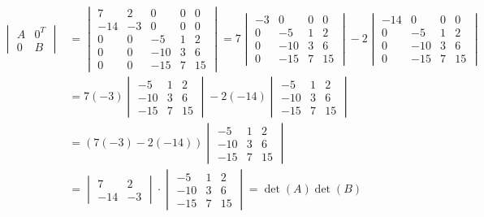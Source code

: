 \documentclass[12pt,a4paper]{article}
\begin{document}
\begin{enumerate}
\begin{enumerate}
\begin{align*}
\begin{vmatrix}
A & 0^T \\
0 & B
\end{vmatrix}
& =
\begin{vmatrix}
  7 &  2 &   0 & 0 & 0 \\
-14 & -3 &   0 & 0 & 0 \\
  0 &  0 &  -5 & 1 & 2 \\
  0 &  0 & -10 & 3 & 6 \\
  0 &  0 & -15 & 7 & 15
\end{vmatrix}
=
7
\begin{vmatrix}
-3 &   0 & 0 & 0 \\
 0 &  -5 & 1 & 2 \\
 0 & -10 & 3 & 6 \\
 0 & -15 & 7 & 15
\end{vmatrix}
-2
\begin{vmatrix}
-14 &   0 & 0 & 0 \\
  0 &  -5 & 1 & 2 \\
  0 & -10 & 3 & 6 \\
  0 & -15 & 7 & 15
\end{vmatrix} \\
& =
7 (-3)
\begin{vmatrix}
 -5 & 1 & 2 \\
-10 & 3 & 6 \\
-15 & 7 & 15
\end{vmatrix}
-2(-14)
\begin{vmatrix}
 -5 & 1 & 2 \\
-10 & 3 & 6 \\
-15 & 7 & 15
\end{vmatrix} \\
& =
( 7 (-3) -2(-14) )
\begin{vmatrix}
 -5 & 1 & 2 \\
-10 & 3 & 6 \\
-15 & 7 & 15
\end{vmatrix} \\
& =
\begin{vmatrix}
  7 &  2 \\
-14 & -3
\end{vmatrix}
\cdot 
\begin{vmatrix}
-5 & 1 & 2 \\
-10 & 3 & 6 \\
-15 & 7 & 15
\end{vmatrix}
= \det(A) \det(B)
\end{align*}


\end{enumerate}
\end{enumerate}
\end{document}
